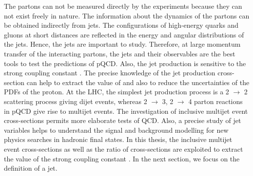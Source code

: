 The partons can not be measured directly by the experiments because they can not exist freely in nature. The information about the dynamics of the partons can be obtained indirectly from jets. The configurations of high-energy quarks and gluons at short distances are reflected in the energy and angular distributions of the jets. Hence, the jets are important to study. Therefore, at large momentum transfer of the interacting partons, the jets and their observables are the best tools to test the predictions of pQCD. Also, the jet production is sensitive to the strong coupling constant \alpsns. The precise knowledge of the jet production cross-section can help to extract the value of \alps and also to reduce the uncertainties of the PDFs of the proton. At the LHC, the simplest jet production process is a 2 $\rightarrow$ 2 scattering process giving dijet events, whereas 2 $\rightarrow$ 3, 2 $\rightarrow$ 4 parton reactions in pQCD give rise to multijet events. The investigation of inclusive multijet event cross-sections permits more elaborate tests of QCD. Also, a precise study of jet variables helps to understand the signal and background modelling for new physics searches in hadronic final states. In this thesis, the inclusive multijet event cross-sections as well as the ratio of cross-sections are exploited to extract the value of the strong coupling constant \alps. In the next section, we focus on the definition of a jet.%

